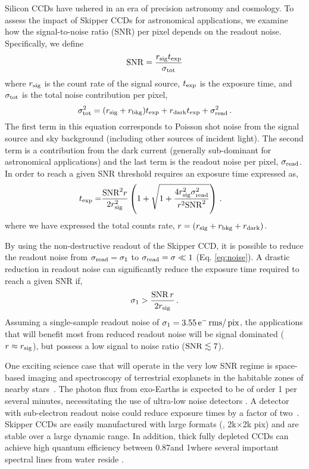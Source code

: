 \documentclass[aps,prl,reprint,superscriptaddress,floatfix,nofootinbib,showkeys,showpacs,preprintnumbers]{revtex4-1}
\begin{document}
Silicon CCDs have ushered in an era of precision astronomy and cosmology.
To assess the impact of Skipper CCDs for astronomical applications, we examine how the signal-to-noise ratio (SNR) per pixel depends on the readout noise. Specifically, we define
\begin{equation}
{\rm SNR} = \frac{r_{\rm sig} t_{\rm exp}}{\sigma_{\rm tot}}
\end{equation}
\noindent where $r_{\rm sig}$ is the count rate of the signal source, $t_{\rm exp}$ is the exposure time, and $\sigma_{\rm tot}$ is the total noise contribution per pixel, 
\begin{equation}
\sigma_{\rm tot}^2 =  (r_{\rm sig} + r_{\rm bkg})t_{\rm exp} + r_{\rm dark} t_{\rm exp} + \sigma_{\rm read}^2\,.
\end{equation}
The first term in this equation corresponds to Poisson shot noise from the signal source and sky background (including other sources of incident light).
The second term is a contribution from the dark current (generally sub-dominant for astronomical applications) and the last term is the readout noise per pixel, $\sigma_{\rm read}$.
In order to reach a given SNR threshold requires an exposure time expressed as,
\begin{align}
t_{\rm exp} =& \frac{{\rm SNR}^2 r}{2 r_{\rm sig}^2} \left (1
 + \sqrt{1 + \frac{4 r_{\rm sig}^2 \sigma_{\rm read}^2}{r^2 {\rm SNR}^2} } \right )\,.
\end{align}
\noindent where we have expressed the total counts rate, $r = (r_{\rm sig} + r_{\rm bkg} + r_{\rm dark})$. 

By using the non-destructive readout of the Skipper CCD, it is possible to reduce the readout noise from $\sigma_{\rm read} = \sigma_1$ to $\sigma_{\rm read} = \sigma \ll 1$ (Eq. \ref{eq:noise}). 
A drastic reduction in readout noise can significantly reduce the exposure time required to reach a given SNR if,
\begin{equation}
\sigma_{1} > \frac{ {\rm SNR}\, r}{2r_{\rm sig}} \, .
\end{equation}
\noindent Assuming a single-sample readout noise of $\sigma_{1} = 3.55 \mathrm{\,e^{-}} \mathrm{\,rms}/\mathrm{\,pix}$, the applications that will benefit most from reduced readout noise will be signal dominated ($r \approx r_{\rm sig}$), but possess a low signal to noise ratio (${\rm SNR} \lesssim 7$). 

One exciting science case that will operate in the very low SNR regime is space-based imaging and spectroscopy of terrestrial exoplanets in the habitable zones of nearby stars~\cite{DecadalReview2010}. 
The photon flux from exo-Earths is expected to be of order 1 per several minutes, necessitating the use of ultra-low noise detectors \cite{ExoPlanet:2017}.
A detector with sub-electron readout noise could reduce exposure times by a factor of two~\cite{Shaklan:2013}.
Skipper CCDs are easily manufactured with large formats (\ie, 2k$\times$2k pix) and are stable over a large dynamic range.
In addition, thick fully depleted CCDs can achieve high quantum efficiency between 0.87\um and 1\um where several important spectral lines from water reside \cite{ExoPlanet:2017}.
\end{document}
